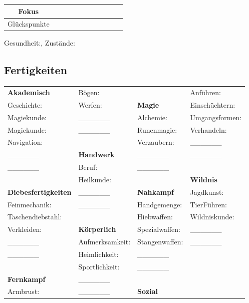 \documentclass{article}
\begin{document}
\medskip
\newline\hline
\medskip
\begin{tabular}{| c | c | c | c | c | c | c | c | c | c | c |}
\hline
Fokus&&&&&&&&&&\\
\hline
Glückspunkte&&&&&&&&&&\\
\hline
\end{tabular}
\newline

Gesundheit:\space\space\space\space\space, Zustände:
\newline\hline
\begin{center}
\subsection{Fertigkeiten}
\end{center}
\begin{tabular}{ m{4cm}  m{4cm}  m{4cm}  m{4cm} }
\textbf{Akademisch}&Bögen:&&Anführen:\\
Geschichte:&Werfen:&\textbf{Magie}&Einschüchtern:\\
Magiekunde:&\_\_\_\_\_\_&Alchemie:&Umgangsformen:\\
Magiekunde:&\_\_\_\_\_\_&Runenmagie:&Verhandeln:\\
Navigation:&&Verzaubern:&\_\_\_\_\_\_\\
\_\_\_\_\_\_&\textbf{Handwerk}&\_\_\_\_\_\_&\_\_\_\_\_\_\\
\_\_\_\_\_\_&Beruf:&\_\_\_\_\_\_&\\
&Heilkunde:&&\textbf{Wildnis}\\
\textbf{Diebesfertigkeiten}&\_\_\_\_\_\_&\textbf{Nahkampf}&Jagdkunst:\\
Feinmechanik:&\_\_\_\_\_\_&Handgemenge:&TierFühren:\\
Taschendiebstahl:&&Hiebwaffen:&Wildniskunde:\\
Verkleiden:&\textbf{Körperlich}&Spezialwaffen:&\_\_\_\_\_\_\\
\_\_\_\_\_\_&Aufmerksamkeit:&Stangenwaffen:&\_\_\_\_\_\_\\
\_\_\_\_\_\_&Heimlichkeit:&\_\_\_\_\_\_&\\
&Sportlichkeit:&\_\_\_\_\_\_&\\
\textbf{Fernkampf}&\_\_\_\_\_\_&&\\
Armbrust:&\_\_\_\_\_\_&\textbf{Sozial}&\\
\end{tabular}
\end{document}
